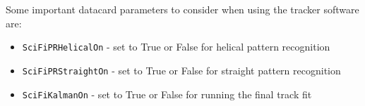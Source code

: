 \noindent
Some important datacard parameters to consider when using the tracker software are:

\begin{itemize}
 \item \verb;SciFiPRHelicalOn; - set to True or False for helical pattern recognition
 \item \verb;SciFiPRStraightOn; - set to True or False for straight pattern recognition
 \item \verb;SciFiKalmanOn; - set to True or False for running the final track fit
\end{itemize}
